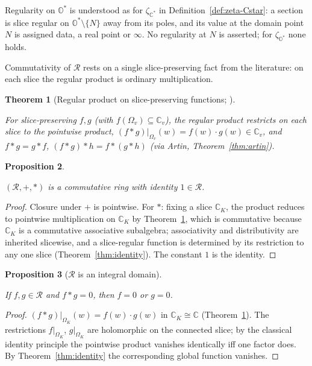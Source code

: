 \documentclass[11pt]{article}
\newcommand{\OO}{\mathbb{O}}
\newcommand{\CC}{\mathbb{C}}
\newcommand{\Ostar}{\OO^{*}}
\newcommand{\Cstar}{\CC^{*}}
\newcommand{\zetaO}{\zeta_{\Ostar}}
\newcommand{\zetaC}{\zeta_{\Cstar}}
\providecommand{\lean}[1]{}
\providecommand{\uses}[1]{}
\theoremstyle{plain}
\newtheorem{theorem}{Theorem}[section]
\newtheorem{proposition}[theorem]{Proposition}
\theoremstyle{definition}
\theoremstyle{remark}
\begin{document}
Regularity on $\Ostar$ is understood as for $\zetaC$ in Definition~\ref{def:zeta-Cstar}: a
section is slice regular on $\Ostar\setminus\{N\}$ away from its poles, and its value at the
domain point $N$ is assigned data, a real point or $\infty$. No regularity at $N$ is asserted;
for $\zetaO$ none holds.

Commutativity of $\mathcal R$ rests on a single slice-preserving fact from the literature: on each
slice the regular product is ordinary multiplication.

\begin{theorem}[Regular product on slice-preserving functions; {\cite[Rem.~2.11]{Wang}}]\label{thm:wang}
\uses{thm:artin, def:R}
For slice-preserving $f,g$ (with $f(\Omega_v)\subseteq\CC_v$), the regular product
restricts on each slice to the pointwise product, $(f\ast g)|_{\Omega_v}(w)=f(w)\cdot
g(w)\in\CC_v$, and $f\ast g=g\ast f$, $(f\ast g)\ast h=f\ast(g\ast h)$ (via Artin,
Theorem~\ref{thm:artin}).
\end{theorem}

\begin{proposition}\label{prop:R-comm-ring}
\lean{StemRing}
\uses{thm:wang, thm:identity, def:R}
$(\mathcal R,+,\ast)$ is a commutative ring with identity $1\in\mathcal R$.
\end{proposition}
\begin{proof}
Closure under $+$ is pointwise. For $\ast$: fixing a slice $\CC_K$, the product
reduces to pointwise multiplication on $\CC_K$ by Theorem~\ref{thm:wang}, which is
commutative because $\CC_K$ is a commutative associative subalgebra; associativity
and distributivity are inherited slicewise, and a slice-regular function is
determined by its restriction to any one slice (Theorem~\ref{thm:identity}). The
constant $1$ is the identity.
\end{proof}

\begin{proposition}[$\mathcal R$ is an integral domain]\label{prop:R-domain}
\lean{StemRing.eq_zero_or_eq_zero_of_mul_eq_zero}
\uses{thm:wang, thm:identity}
If $f,g\in\mathcal R$ and $f\ast g=0$, then $f=0$ or $g=0$.
\end{proposition}
\begin{proof}
$(f\ast g)|_{\Omega_K}(w)=f(w)\cdot g(w)$ in $\CC_K\cong\CC$
(Theorem~\ref{thm:wang}). The restrictions $f|_{\Omega_K}$, $g|_{\Omega_K}$ are
holomorphic on the connected slice; by the classical identity principle the pointwise
product vanishes identically iff one factor does. By Theorem~\ref{thm:identity} the
corresponding global function vanishes.
\end{proof}
\end{document}

